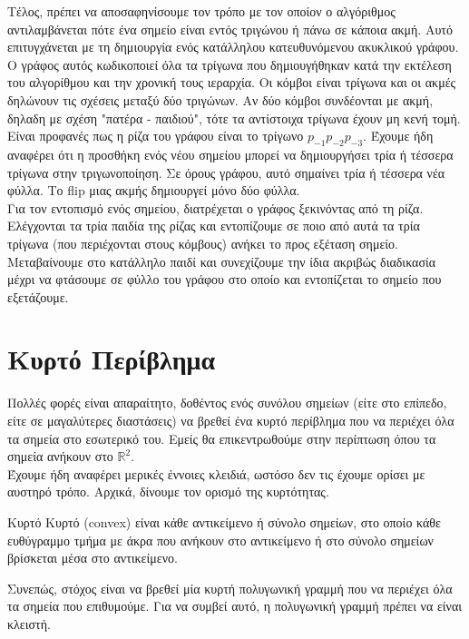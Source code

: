 \documentclass[oneside,12pt]{book}
\newcommand{\R}{\mathbb{R}}
\theoremstyle{definition}
\begin{document}
Τέλος, πρέπει να αποσαφηνίσουμε τον τρόπο με τον οποίον ο αλγόριθμος αντιλαμβάνεται πότε ένα σημείο είναι εντός τριγώνου ή πάνω σε κάποια ακμή. Αυτό επιτυγχάνεται με τη δημιουργία ενός κατάλληλου κατευθυνόμενου ακυκλικού γράφου. Ο γράφος αυτός κωδικοποιεί όλα τα τρίγωνα που δημιουγήθηκαν κατά την εκτέλεση του αλγορίθμου και την χρονική τους ιεραρχία. Οι κόμβοι είναι τρίγωνα και οι ακμές δηλώνουν τις σχέσεις μεταξύ δύο τριγώνων. Αν δύο κόμβοι συνδέονται με ακμή, δηλαδη με σχέση "πατέρα - παιδιού", τότε τα αντίστοιχα τρίγωνα έχουν μη κενή τομή. Είναι προφανές πως η ρίζα του γράφου είναι το τρίγωνο \(p_{-1} p_{-2} p_{-3}\). Έχουμε ήδη αναφέρει ότι η προσθήκη ενός νέου σημείου μπορεί να δημιουργήσει τρία ή τέσσερα τρίγωνα στην τριγωνοποίηση. Σε όρους γράφου, αυτό σημαίνει τρία ή τέσσερα νέα φύλλα. Το flip μιας ακμής δημιουργεί μόνο δύο φύλλα. \\

Για τον εντοπισμό ενός σημείου, διατρέχεται ο γράφος ξεκινόντας από τη ρίζα. Ελέγχονται τα τρία παιδία της ρίζας και εντοπίζουμε σε ποιο από αυτά τα τρία τρίγωνα (που περιέχονται στους κόμβους) ανήκει το προς εξέταση σημείο. Μεταβαίνουμε στο κατάλληλο παιδί και συνεχίζουμε την ίδια ακριβώς διαδικασία μέχρι να φτάσουμε σε φύλλο του γράφου στο οποίο και εντοπίζεται το σημείο που εξετάζουμε. \\

\section{Κυρτό Περίβλημα}

Πολλές φορές είναι απαραίτητο, δοθέντος ενός συνόλου σημείων (είτε στο επίπεδο, είτε σε μαγαλύτερες διαστάσεις) να βρεθεί ένα κυρτό περίβλημα που να περιέχει όλα τα σημεία στο εσωτερικό του. Εμείς θα επικεντρωθούμε στην περίπτωση όπου τα σημεία ανήκουν στο \(\R^2\). \\

Έχουμε ήδη αναφέρει μερικές έννοιες κλειδιά, ωστόσο δεν τις έχουμε ορίσει με αυστηρό τρόπο. Αρχικά, δίνουμε τον ορισμό της κυρτότητας. \\

\begin{mydefinition}{Κυρτό}{}
	Κυρτό (convex) είναι κάθε αντικείμενο ή σύνολο σημείων, στο οποίο κάθε ευθύγραμμο τμήμα με άκρα που ανήκουν στο αντικείμενο ή στο σύνολο σημείων βρίσκεται μέσα στο αντικείμενο.
\end{mydefinition}

Συνεπώς, στόχος είναι να βρεθεί μία κυρτή πολυγωνική γραμμή που να περιέχει όλα τα σημεία που επιθυμούμε. Για να συμβεί αυτό, η πολυγωνική γραμμή πρέπει να είναι κλειστή. \\
\end{document}
